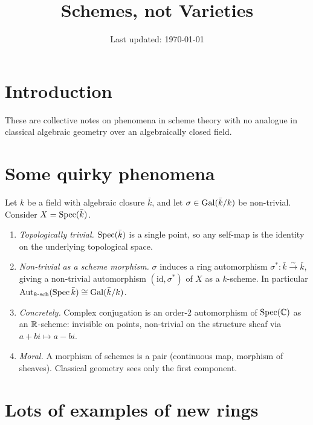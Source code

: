 \documentclass[a4paper, 12pt]{article}
\title{\textbf{Schemes, not Varieties}}
\author{}
\date{Last updated: \today}
\begin{document}
\maketitle
\tableofcontents
\newpage

\section*{Introduction}

These are collective notes on phenomena in scheme theory with no analogue
in classical algebraic geometry over an algebraically closed field.


\section{Some quirky phenomena}

\begin{example}
Let $k$ be a field with algebraic closure $\bar{k}$, and let
$\sigma \in \operatorname{Gal}(\bar{k}/k)$ be non-trivial. Consider $X = \operatorname{Spec}(\bar{k})$.
\leavevmode\begin{enumerate}
\item \emph{Topologically trivial.} $\operatorname{Spec}(\bar{k})$ is a single point, so any
  self-map is the identity on the underlying topological space.
\item \emph{Non-trivial as a scheme morphism.} $\sigma$ induces a ring automorphism
  $\sigma^* \colon \bar{k} \xrightarrow{\sim} \bar{k}$, giving a non-trivial
  automorphism $(\mathrm{id}, \sigma^*)$ of $X$ as a $k$-scheme. In particular
  $\mathrm{Aut}_{k\text{-}\mathrm{sch}}(\operatorname{Spec} \bar{k}) \cong \operatorname{Gal}(\bar{k}/k)$.
\item \emph{Concretely.} Complex conjugation is an order-$2$ automorphism of
  $\operatorname{Spec}(\mathbb{C})$ as an $\mathbb{R}$-scheme: invisible on points, non-trivial on the
  structure sheaf via $a + bi \mapsto a - bi$.
\item \emph{Moral.} A morphism of schemes is a pair (continuous map, morphism of
  sheaves). Classical geometry sees only the first component.
\end{enumerate}
\end{example}


\section{Lots of examples of new rings}
\end{document}
